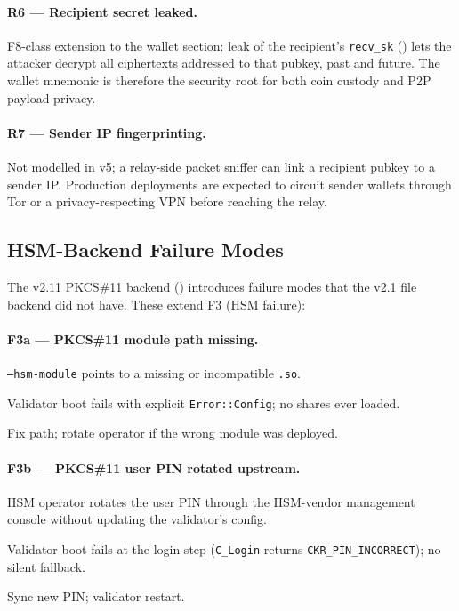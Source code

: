 \paragraph{R6 --- Recipient secret leaked.} F8-class extension to
the wallet section: leak of the recipient's \texttt{recv\_sk}
() lets the attacker decrypt all
ciphertexts addressed to that pubkey, past and future. The wallet
mnemonic is therefore the security root for both coin custody and
P2P payload privacy.

\paragraph{R7 --- Sender IP fingerprinting.} Not modelled in v5; a
relay-side packet sniffer can link a recipient pubkey to a sender IP.
Production deployments are expected to circuit sender wallets
through Tor or a privacy-respecting VPN before reaching the relay.

\subsection{HSM-Backend Failure Modes}
\label{sec:failure-hsm}

The v2.11 PKCS\#11 backend
() introduces failure modes that the
v2.1 file backend did not have. These extend F3 (HSM failure):

\paragraph{F3a --- PKCS\#11 module path missing.}
\begin{description}[leftmargin=2em,style=nextline,itemsep=0pt]
  \item[Trigger] \texttt{--hsm-module} points to a missing or
    incompatible \texttt{.so}.
  \item[Consequence] Validator boot fails with explicit
    \texttt{Error::Config}; no shares ever loaded.
  \item[Recovery] Fix path; rotate operator if the wrong module was
    deployed.
\end{description}

\paragraph{F3b --- PKCS\#11 user PIN rotated upstream.}
\begin{description}[leftmargin=2em,style=nextline,itemsep=0pt]
  \item[Trigger] HSM operator rotates the user PIN through the
    HSM-vendor management console without updating the validator's
    config.
  \item[Consequence] Validator boot fails at the login step
    (\texttt{C\_Login} returns \texttt{CKR\_PIN\_INCORRECT}); no
    silent fallback.
  \item[Recovery] Sync new PIN; validator restart.
\end{description}

